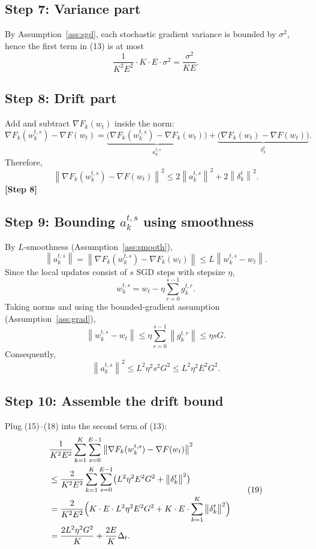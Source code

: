 \documentclass{article}
\newcommand{\norm}[1]{\left\|#1\right\|}
\newcommand{\grad}{\nabla}
\begin{document}
\subsection*{Step 7: Variance part}
By Assumption~\ref{ass:sgd}, each stochastic gradient variance is bounded by $\sigma^{2}$,
hence the first term in (13) is at most
\[
\frac{1}{K^{2}E^{2}}\cdot K\cdot E\cdot\sigma^{2}= \frac{\sigma^{2}}{KE}.
\tag{14}
\]

\subsection*{Step 8: Drift part}
Add and subtract $\grad F_k(w_t)$ inside the norm:
\[
\grad F_k(w_{k}^{t,s})-\grad F(w_t)
= \underbrace{\bigl(\grad F_k(w_{k}^{t,s})-\grad F_k(w_t)\bigr)}_{\displaystyle a_{k}^{t,s}}
+ \underbrace{\bigl(\grad F_k(w_t)-\grad F(w_t)\bigr)}_{\displaystyle \delta_k^{t}} .
\]
Therefore,
\[
\norm{\grad F_k(w_{k}^{t,s})-\grad F(w_t)}^{2}
\le 2\norm{a_{k}^{t,s}}^{2}+2\norm{\delta_k^{t}}^{2}.
\tag{15}
\]
\textbf{[Step 8]}

\subsection*{Step 9: Bounding $a_{k}^{t,s}$ using smoothness}
By $L$‑smoothness (Assumption~\ref{ass:smooth}),
\[
\norm{a_{k}^{t,s}} = \norm{\grad F_k(w_{k}^{t,s})-\grad F_k(w_t)}
\le L \norm{w_{k}^{t,s}-w_t}.
\tag{16}
\]
Since the local updates consist of $s$ SGD steps with stepsize $\eta$,
\[
w_{k}^{t,s}= w_t -\eta\sum_{r=0}^{s-1} g_{k}^{t,r}.
\]
Taking norms and using the bounded‑gradient assumption (Assumption~\ref{ass:grad}),
\[
\norm{w_{k}^{t,s}-w_t}
\le \eta\sum_{r=0}^{s-1}\norm{g_{k}^{t,r}}
\le \eta s G .
\tag{17}
\]
Consequently,
\[
\norm{a_{k}^{t,s}}^{2}
\le L^{2}\eta^{2}s^{2}G^{2}
\le L^{2}\eta^{2}E^{2}G^{2}.
\tag{18}
\]

\subsection*{Step 10: Assemble the drift bound}
Plug (15)–(18) into the second term of (13):
\[
\begin{aligned}
&\frac{1}{K^{2}E^{2}}\sum_{k=1}^{K}\sum_{s=0}^{E-1}
\norm{\grad F_k(w_{k}^{t,s})-\grad F(w_t)}^{2}\\
&\le \frac{2}{K^{2}E^{2}}\sum_{k=1}^{K}\sum_{s=0}^{E-1}
\bigl(L^{2}\eta^{2}E^{2}G^{2}+ \norm{\delta_k^{t}}^{2}\bigr)\\
&= \frac{2}{K^{2}E^{2}}\Bigl(K\cdot E\cdot L^{2}\eta^{2}E^{2}G^{2}
+ K\cdot E\cdot \sum_{k=1}^{K}\norm{\delta_k^{t}}^{2}\Bigr)\\
&= \frac{2L^{2}\eta^{2}G^{2}}{K} + \frac{2E}{K}\Delta_t .
\end{aligned}
\tag{19}
\]
\end{document}
